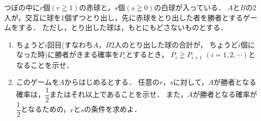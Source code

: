 \documentclass[../../main.tex]{subfiles}
\begin{document}
つぼの中に$r$個$(r\geqq1)$の赤球と，$s$個$(s\geqq0)$の白球が入っている．
$A$と$B$の2人が，交互に球を1個ずつとり出し，先に赤球をとり出した者を勝者とするゲームをする．
ただし，とり出した球は，もとにもどさないものとする．
\begin{enumerate}
  \item ちょうど$i$回目(すなわち$A$，$B$2人のとり出した球の合計が，
    ちょうど$i$個になった時)に勝者がきまる確率を$P_i$とするとき，
    $P_i \geqq P_{i+1}$ $(i=1,2,\cdots)$となることを示せ．
  \item このゲームを$A$からはじめるとする．
    任意の$r$，$s$に対して，$A$が勝者となる確率は，$\displaystyle\dfrac{1}{2}$またはそれ以上であることを示せ．
    また，$A$が勝者となる確率が$\displaystyle\dfrac{1}{2}$となるための，$r$と$s$の条件を求めよ．
\end{enumerate}
\end{document}
